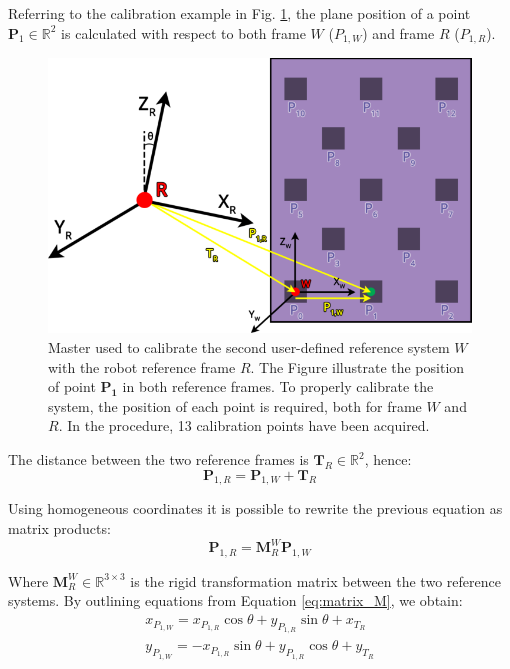 \documentclass[a4paper, 10pt, conference]{ieeeconf}      %
\begin{document}
Referring to the calibration example in Fig. \ref{fig:master_robot}, the plane position of a point $\mathbf{P}_1\in\mathbb{R}^2$ is calculated with respect to both frame $W$ ($P_{1,W}$) and frame $R$ ($P_{1,R}$).
\begin{figure}[h]
	\centering
	\includegraphics[width=1\columnwidth]{figures/calibration.eps}
	\caption{Master used to calibrate the second user-defined reference system $W$ with the robot reference frame $R$. The Figure illustrate the position of  point $\mathbf{P_1}$ in both reference frames. To properly calibrate the system, the position of each point is required, both for frame $W$ and $R$. In the procedure, 13 calibration points have been acquired.}
	\label{fig:master_robot}
\end{figure}
The distance between the two reference frames is $\mathbf{T}_R\in\mathbb{R}^2$, hence:
\begin{equation}
\mathbf{P}_{1,R} = \mathbf{P}_{1,W} + \mathbf{T}_R
\end{equation}

Using homogeneous coordinates it is possible to rewrite the previous equation as matrix products:
\begin{equation}\label{eq:matrix_M}
\mathbf{P}_{1,R} = \mathbf{M}^W_{R}\mathbf{P}_{1,W}
\end{equation}

Where $\mathbf{M}^W_{R}\in\mathbb{R}^{3\times3}$ is the rigid transformation matrix between the two reference systems. By outlining equations from Equation \ref{eq:matrix_M}, we obtain:
\begin{equation}\label{eq:linear_sys1}
\begin{gathered}
x_{P_{1,W}}=x_{P_{1,R}}\cos\theta+y_{P_{1,R}}\sin\theta+x_{T_R}\\
y_{P_{1,W}}=-x_{P_{1,R}}\sin\theta+y_{P_{1,R}}\cos\theta+y_{T_R}
\end{gathered}
\end{equation}
\end{document}
